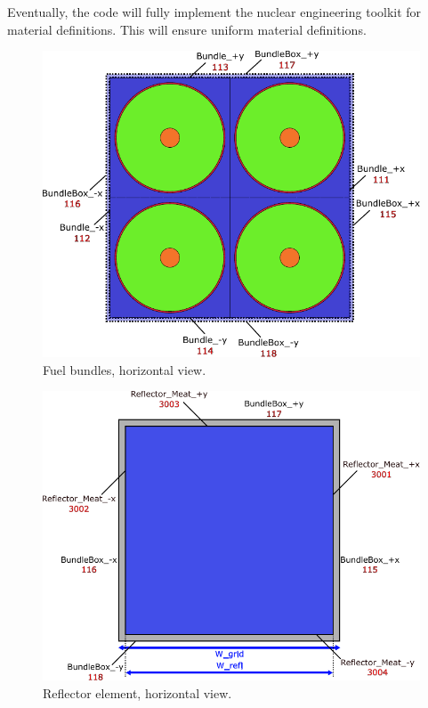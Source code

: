 \documentclass{UWNR_modeling}
\begin{document}
Eventually, the code will fully implement the nuclear engineering toolkit for material definitions. This will ensure uniform material definitions.






\setlength{\baselineskip}{12pt}




\newpage
\appendix
\begin{figure}[H]
  \centering
  \includegraphics[width=5in]{bundle_xy.pdf}
  \caption{Fuel bundles, horizontal view.}
  \label{fig:bundle_xy}
\end{figure}
\begin{figure}[H]
  \centering
  \includegraphics[width=5in]{Refl_xy.pdf}
  \caption{Reflector element, horizontal view.}
  \label{fig:Refl_xy}
\end{figure}
\end{document}
